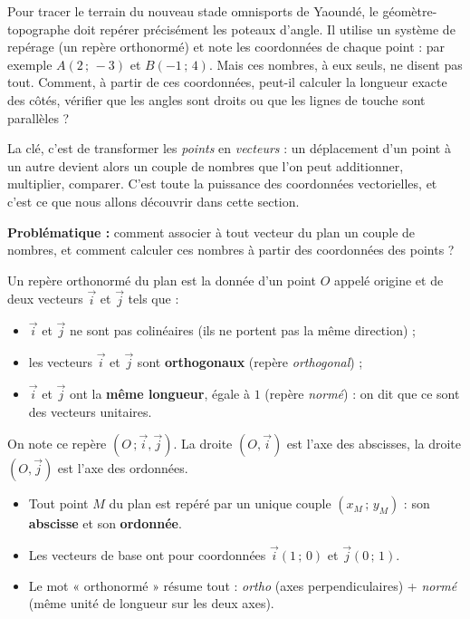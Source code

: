 \documentclass[11pt]{article}
\newcommand{\cle}[1]{{\popxbold\color{popdark}#1}}
\newcounter{popsec}
\newcounter{popsub}
\newcommand{\courssub}[1]{%
  \stepcounter{popsub}%
  \par\vspace{9pt}\noindent{\popxbold\fontsize{11.5}{13}\selectfont\color{popink}{\color{poporange}\thepopsec.\thepopsub}\hspace{6pt}#1}\par\nopagebreak\vspace{4pt}
}
\begin{document}
Pour tracer le terrain du nouveau stade omnisports de Yaoundé, le géomètre-topographe doit repérer précisément les poteaux d'angle. Il utilise un système de repérage (un repère orthonormé) et note les coordonnées de chaque point : par exemple $A(2\,;\,-3)$ et $B(-1\,;\,4)$. Mais ces nombres, à eux seuls, ne disent pas tout. Comment, à partir de ces coordonnées, peut-il calculer la longueur exacte des côtés, vérifier que les angles sont droits ou que les lignes de touche sont parallèles ?

La clé, c'est de transformer les \emph{points} en \emph{vecteurs} : un déplacement d'un point à un autre devient alors un couple de nombres que l'on peut additionner, multiplier, comparer. C'est toute la puissance des \cle{coordonnées vectorielles}, et c'est ce que nous allons découvrir dans cette section.

\textbf{Problématique :} comment associer à tout vecteur du plan un couple de nombres, et comment calculer ces nombres à partir des coordonnées des points ?

\courssub{Rappel : le repère orthonormé $(O\,;\vec{i},\vec{j})$}

\begin{definition}
Un \cle{repère orthonormé} du plan est la donnée d'un point $O$ appelé \cle{origine} et de deux vecteurs $\vec{i}$ et $\vec{j}$ tels que :
\begin{itemize}
\item $\vec{i}$ et $\vec{j}$ ne sont pas colinéaires (ils ne portent pas la même direction) ;
\item les vecteurs $\vec{i}$ et $\vec{j}$ sont \textbf{orthogonaux} (repère \emph{orthogonal}) ;
\item $\vec{i}$ et $\vec{j}$ ont la \textbf{même longueur}, égale à $1$ (repère \emph{normé}) : on dit que ce sont des \cle{vecteurs unitaires}.
\end{itemize}
On note ce repère $(O\,;\vec{i},\vec{j})$. La droite $(O,\vec{i})$ est l'\cle{axe des abscisses}, la droite $(O,\vec{j})$ est l'\cle{axe des ordonnées}.
\end{definition}

\begin{aretenir}
\begin{itemize}
\item Tout point $M$ du plan est repéré par un unique couple $(x_M\,;\,y_M)$ : son \textbf{abscisse} et son \textbf{ordonnée}.
\item Les vecteurs de base ont pour coordonnées $\vec{i}(1\,;\,0)$ et $\vec{j}(0\,;\,1)$.
\item Le mot « orthonormé » résume tout : \emph{ortho} (axes perpendiculaires) + \emph{normé} (même unité de longueur sur les deux axes).
\end{itemize}
\end{aretenir}
\end{document}
